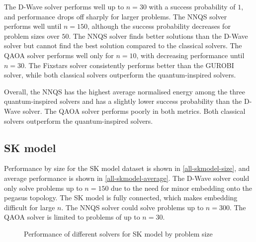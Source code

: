 The D-Wave solver performs well up to $n=30$ with a success probability of $1$, and performance drops off sharply for larger problems. The NNQS solver performs well until $n=150$, although the success probability decreases for problem sizes over $50$. The NNQS solver finds better solutions than the D-Wave solver but cannot find the best solution compared to the classical solvers. The QAOA solver performs well only for $n=10$, with decreasing performance until $n=30$. The Fixstars solver consistently performs better than the GUROBI solver, while both classical solvers outperform the quantum-inspired solvers.

Overall, the NNQS has the highest average normalised energy among the three quantum-inspired solvers and has a slightly lower success probability than the D-Wave solver. The QAOA solver performs poorly in both metrics. Both classical solvers outperform the quantum-inspired solvers.

\subsection{SK model}
Performance by size for the SK model dataset is shown in \autoref{all-skmodel-size}, and average performance is shown in \autoref{all-skmodel-average}. The D-Wave solver could only solve problems up to $n=150$ due to the need for minor embedding onto the pegasus topology. The SK model is fully connected, which makes embedding difficult for large $n$. The NNQS solver could solve problems up to $n=300$. The QAOA solver is limited to problems of up to $n=30$.

\begin{figure}[!htb]
    \centering
    \caption{Performance of different solvers for SK model by problem size}
    \label{all-skmodel-size}
\end{figure}

